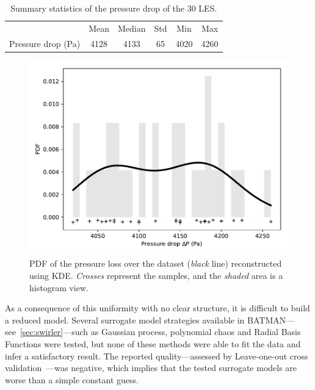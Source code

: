 \begin{table}[!ht]
\centering
\caption{Summary statistics of the pressure drop of the 30 LES.}
\begin{tabular}{lccccc}
\toprule
& Mean & Median & Std & Min & Max\\
\cmidrule{2-6}
Pressure drop (Pa) & 4128 & 4133 & 65 & 4020 & 4260\\
\bottomrule
\end{tabular}
\label{tab:summary-stats}
\end{table}

\begin{figure}[!ht]
\centering
\includegraphics[width=0.6\linewidth,keepaspectratio]{fig/applications/swirler/pdf_dp_ensemble.pdf}
\caption{PDF of the pressure loss over the dataset (\emph{black} line) reconstructed using KDE. \emph{Crosses} represent the samples, and the \emph{shaded} area is a histogram view.}
\label{fig:pdf-dp}
\end{figure}

As a consequence of this uniformity with no clear structure, it is difficult to build a reduced model. Several surrogate model strategies available in BATMAN---see~\cref{sec:swirler}---such as Gaussian process, polynomial chaos and Radial Basis Functions were tested, but none of these methods were able to fit the data and infer a satisfactory result. The reported quality---assessed by Leave-one-out cross validation~\cite{Kohavi1995}---was negative, which implies that the tested surrogate models are worse than a simple constant guess.

